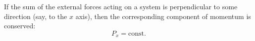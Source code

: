 If the sum of the external forces acting on a system is perpendicular to some direction (say, to the $x$ axis), then the corresponding component of momentum is conserved:
$$P_x = \text{const}.$$
